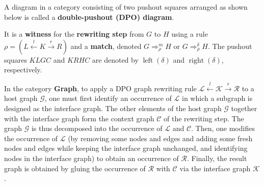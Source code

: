 \begin{definition} 
  \label{def:rewriting_step}
    A diagram in a category consisting of two pushout squares arranged as shown below
    is called a \textbf{double-pushout (DPO) diagram}.
    \begin{center}
    \end{center}
      It is a \textbf{witness} for the \textbf{rewriting step} from \( G \) to \( H \) using 
      a rule \( \rho = (L \overset{l}{\leftarrow} K \overset{r}{\rightarrow} R) \) and a \textbf{match}, denoted \( G \Rightarrow_\rho^m H \) or \( G \Rightarrow_\rho^\delta H \). The pushout squares $KLGC$ and $KRHC$ are denoted by $\operatorname{left}(\delta)$ and $\operatorname{right}(\delta)$, respectively.
  \end{definition}
In the category \textbf{Graph}, to apply a DPO graph rewriting rule $\mathcal{L} \overset{l}{\leftarrow} \mathcal{K} \overset{r}{\rightarrow} \mathcal{R}$ to a host graph $\mathcal{G}$, one must first identify an occurrence of $\mathcal{L}$ in which a subgraph is designed as the interface graph. The other elements of the host graph $\mathcal{G}$ together with the interface graph form the context graph $\mathcal{C}$ of the rewriting step.
The graph $\mathcal{G}$ is thus decomposed into the occurrence of $\mathcal{L}$ and $\mathcal{C}$. 
Then, one modifies the occurrence of $\mathcal{L}$ (by removing some nodes and edges and adding some fresh nodes and edges while keeping the interface graph unchanged, and identifying nodes in the interface graph)
to obtain an occurrence of $\mathcal{R}$. Finally, the result graph is obtained by gluing the occurrence of $\mathcal{R}$ with $\mathcal{C}$ via the interface graph $\mathcal{K}$.

